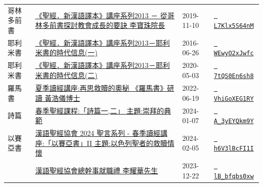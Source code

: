\documentclass{book}
\begin{document}
{\begin{xltabular}{\textwidth}{|p{0.15\textwidth} p{0.6\textwidth}|p{0.07\textwidth} p{0.1\textwidth}|}
哥林多前書   & \hyperref[sec:L7Klx5S64nM]{《聖經．新漢語譯本》講座系列2013 － 從哥林多前書探討教會成長的要訣 李寶珠院長} & 2019-11-10 & \href{https://youtube.com/watch?v=L7Klx5S64nM}{\texttt{ L7Klx5S64nM}} \\
耶利米書   & \hyperref[sec:WEwyO2xJwfc]{《聖經．新漢語譯本》講座系列2013－耶利米書的時代信息(一)} & 2016-06-26 & \href{https://youtube.com/watch?v=WEwyO2xJwfc}{\texttt{ WEwyO2xJwfc}} \\
耶利米書   & \hyperref[sec:7tQS0En6sh8]{《聖經．新漢語譯本》講座系列2013－耶利米書的時代信息(二)} & 2020-05-03 & \href{https://youtube.com/watch?v=7tQS0En6sh8}{\texttt{ 7tQS0En6sh8}} \\
羅馬書   & \hyperref[sec:VhiGoXEG1RY]{夏季讀經講座:再思救贖的奧秘 《羅馬書》研讀 黃浩儀博士} & 2022-06-19 & \href{https://youtube.com/watch?v=VhiGoXEG1RY}{\texttt{ VhiGoXEG1RY}} \\
詩篇   & \hyperref[sec:A_3yEYQkm9Y]{春季聖經課程:「詩篇一,二」 主題:崇拜的典範} & 2024-01-07 & \href{https://youtube.com/watch?v=A_3yEYQkm9Y}{\texttt{ A\_3yEYQkm9Y}} \\
以賽亞書   & \hyperref[sec:h6V3lBcFI1I]{漢語聖經協會 2024 聖言系列 - 春季讀經講座:「以賽亞書」II 主題:以色列聖者的救贖情懷} & 2024-02-05 & \href{https://youtube.com/watch?v=h6V3lBcFI1I}{\texttt{ h6V3lBcFI1I}} \\
    & \hyperref[sec:lB_bfqbs0xw]{漢語聖經協會總幹事就職禮 李耀華先生} & 2023-12-22 & \href{https://youtube.com/watch?v=lB_bfqbs0xw}{\texttt{ lB\_bfqbs0xw}} \\
\end{xltabular}
}
\newpage
\end{document}
